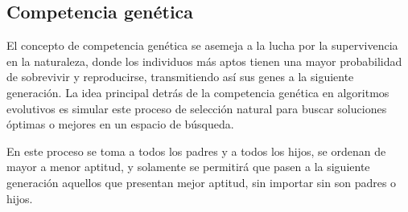 \subsection{Competencia genética}
El concepto de competencia genética se asemeja a la lucha por la supervivencia en la naturaleza, donde los individuos más aptos tienen una mayor probabilidad de sobrevivir y reproducirse, transmitiendo así sus genes a la siguiente generación. La idea principal detrás de la competencia genética en algoritmos evolutivos es simular este proceso de selección natural para buscar soluciones óptimas o mejores en un espacio de búsqueda.

En este proceso se toma a todos los padres y a todos los hijos, se ordenan de mayor a menor aptitud, y solamente se permitirá que pasen a la siguiente generación aquellos que presentan mejor aptitud, sin importar sin son padres o hijos.

